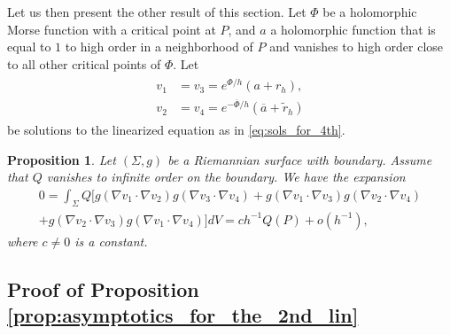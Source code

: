 \documentclass[12pt]{amsart}
\newtheorem{proposition}[theorem]{Proposition}
\theoremstyle{definition}
\theoremstyle{remark}
\begin{document}
Let us then present the other result of this section. Let $\Phi$ be a holomorphic Morse function with a critical point at $P$, and $a$ a holomorphic function that is equal to $1$ to high order in a neighborhood of $P$ and vanishes to high order close to all other critical points of $\Phi$. Let
\begin{align*}%
    \begin{split}
    v_1&=v_3=e^{\Phi/h}(a+r_h), \\
    v_2&=v_4=e^{-\overline \Phi/h}(\overline a+\tilde r_h)
    \end{split}
    \end{align*}
    be solutions to the linearized equation as in \eqref{eq:sols_for_4th}.
\begin{proposition}\label{prop:asymptotics_for_the_3rd_lin}
 Let $(\Sigma,g)$ be a Riemannian surface with boundary.  Assume that $Q$ vanishes to infinite order on the boundary. We have the expansion 
 \begin{multline*}
  0=\int_{\Sigma}Q\Big[g(\nabla v_1\cdot \nabla v_2)g(\nabla v_3\cdot \nabla  v_4)+g(\nabla v_1\cdot \nabla v_3)g(\nabla v_2\cdot \nabla  v_4) \\
 +g(\nabla v_2\cdot \nabla v_3)g(\nabla v_1\cdot \nabla  v_4)\Big]dV=ch^{-1}Q(P)+o(h^{-1}),
 \end{multline*}
 where $c\neq 0$ is a constant.
\end{proposition}

\subsection{Proof of Proposition \ref{prop:asymptotics_for_the_2nd_lin}}
\end{document}
